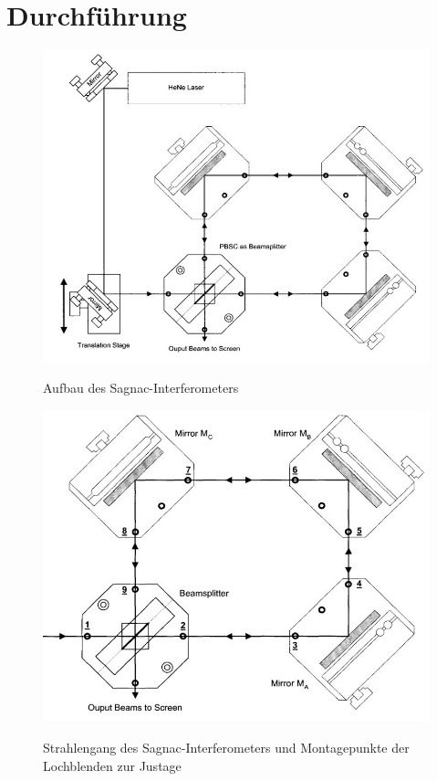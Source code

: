 	\section{Durchführung}

  \begin{figure}[H]
    \center
    \includegraphics[width=\textwidth]{./plots/Versuchsaufbau.JPG}
    \label{fig:aufbau}
    \caption{Aufbau des Sagnac-Interferometers}
  \end{figure}
  \begin{figure}[H]
    \center
    \includegraphics[width=\textwidth]{./plots/Strahlengang.JPG}
    \label{fig:bauteilpos}
    \caption{Strahlengang des Sagnac-Interferometers und Montagepunkte der Lochblenden zur Justage}
  \end{figure}
